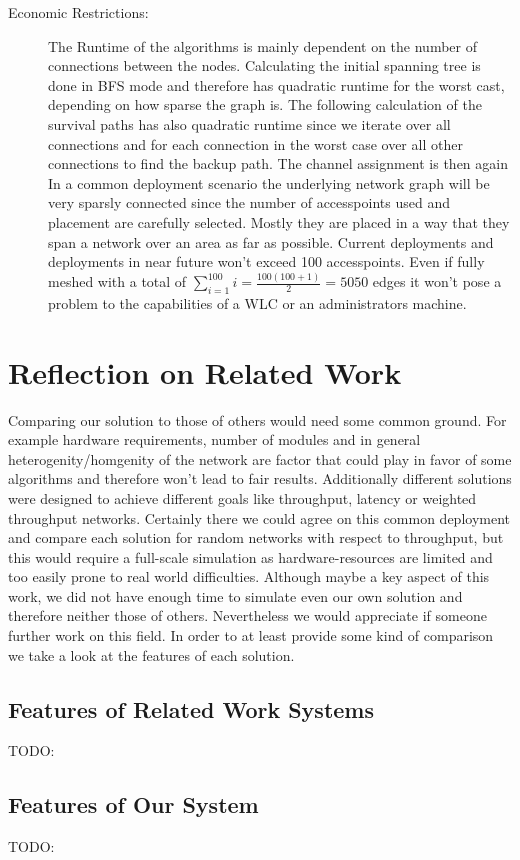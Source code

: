 \begin{description}
    \item[Economic Restrictions:]
      The Runtime of the algorithms is mainly dependent on the number of connections between the nodes. Calculating the initial spanning tree is done in BFS mode and 
      therefore has quadratic runtime for the worst cast, depending on how sparse the graph is. The following calculation of the survival paths has also quadratic runtime 
      since we iterate over all connections and for each connection in the worst case over all other connections to find the backup path. The channel assignment is then again
      In a common deployment scenario the underlying network graph will be very sparsly connected since the number of accesspoints used and placement are carefully selected.
      Mostly they are placed in a way that they span a network over an area as far as possible.
      Current deployments and deployments in near future won't exceed 100 accesspoints. 
      Even if fully meshed with a total of \(\sum \limits_{i=1}^{100} i = \frac{100(100+1)}{2}=5050\)
      edges it won't pose a problem to the capabilities of a WLC or an administrators machine.
      
  \end{description}
    
\section{Reflection on Related Work}
  Comparing our solution to those of others would need some common ground. For example hardware requirements, number of modules and in general heterogenity/homgenity of
  the network are factor that could play in favor of some algorithms and therefore won't lead to fair results. Additionally different solutions were designed to 
  achieve different goals like throughput, latency or weighted throughput networks. Certainly there we could agree on this common deployment and compare each solution for random
  networks with respect to throughput, but this would require a full-scale simulation as hardware-resources are limited and too easily prone to real world difficulties.
  Although maybe a key aspect of this work, we did not have enough time to simulate even our own solution and therefore neither those of others. Nevertheless we would appreciate
  if someone further work on this field. In order to at least provide some kind of comparison we take a look at the features of each solution.
  
  \subsection{Features of Related Work Systems}
    TODO:
  \subsection{Features of Our System}
    TODO: